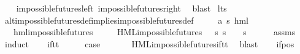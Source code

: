 \begin{isabellebody}
%
\isadelimproof
\ \ %
\endisadelimproof
%
\isatagproof
{}\isamarkupfalse%
\ impossible{\isacharunderscore}{\kern0pt}futures{\isacharunderscore}{\kern0pt}left\ impossible{\isacharunderscore}{\kern0pt}futures{\isacharunderscore}{\kern0pt}right\ \isamarkupfalse%
\ blast%
\endisatagproof
{\isafoldproof}%
%
\isadelimproof
\isanewline
%
\endisadelimproof
\isanewline
{}\isamarkupfalse%
\ lts\ \isanewline
{}\isamarkupfalse%
\ alt{\isacharunderscore}{\kern0pt}impossible{\isacharunderscore}{\kern0pt}futures{\isacharunderscore}{\kern0pt}def{\isacharunderscore}{\kern0pt}implies{\isacharunderscore}{\kern0pt}impossible{\isacharunderscore}{\kern0pt}futures{\isacharunderscore}{\kern0pt}def{\isacharcolon}{\kern0pt}\isanewline
\ \ \ {\isasymphi}\ {\isacharcolon}{\kern0pt}{\isacharcolon}{\kern0pt}\ {\isachardoublequoteopen}{\isacharparenleft}{\kern0pt}{\isacharprime}{\kern0pt}a{\isacharcomma}{\kern0pt}\ {\isacharprime}{\kern0pt}s{\isacharparenright}{\kern0pt}\ hml{\isachardoublequoteclose}\isanewline
\ \ \ {\isachardoublequoteopen}hml{\isacharunderscore}{\kern0pt}impossible{\isacharunderscore}{\kern0pt}futures\ {\isasymphi}{\isachardoublequoteclose}\isanewline
\ \ \ {\isachardoublequoteopen}{\isasymexists}{\isasympsi}{\isachardot}{\kern0pt}\ HML{\isacharunderscore}{\kern0pt}impossible{\isacharunderscore}{\kern0pt}futures\ {\isasympsi}\ {\isasymand}\ {\isacharparenleft}{\kern0pt}{\isasymforall}s{\isachardot}{\kern0pt}\ {\isacharparenleft}{\kern0pt}s\ {\isasymTurnstile}\ {\isasymphi}{\isacharparenright}{\kern0pt}\ {\isasymlongleftrightarrow}\ {\isacharparenleft}{\kern0pt}s\ {\isasymTurnstile}\ {\isasympsi}{\isacharparenright}{\kern0pt}{\isacharparenright}{\kern0pt}{\isachardoublequoteclose}\isanewline
%
\isadelimproof
\ \ %
\endisadelimproof
%
\isatagproof
{}\isamarkupfalse%
\ assms\ \isamarkupfalse%
\ induct\isanewline
\ \ \isamarkupfalse%
\ if{\isacharunderscore}{\kern0pt}tt\isanewline
\ \ \isamarkupfalse%
\ \isamarkupfalse%
\ {\isacharquery}{\kern0pt}case\ \isanewline
\ \ \ \ \isamarkupfalse%
\ HML{\isacharunderscore}{\kern0pt}impossible{\isacharunderscore}{\kern0pt}futures{\isachardot}{\kern0pt}if{\isacharunderscore}{\kern0pt}tt\ \isamarkupfalse%
\ blast\isanewline
{}\isamarkupfalse%
\isanewline
\ \ \isamarkupfalse%
\ {\isacharparenleft}{\kern0pt}if{\isacharunderscore}{\kern0pt}pos\ {\isasymphi}\ {\isasymalpha}{\isacharparenright}{\kern0pt}\isanewline

\end{isabellebody}
